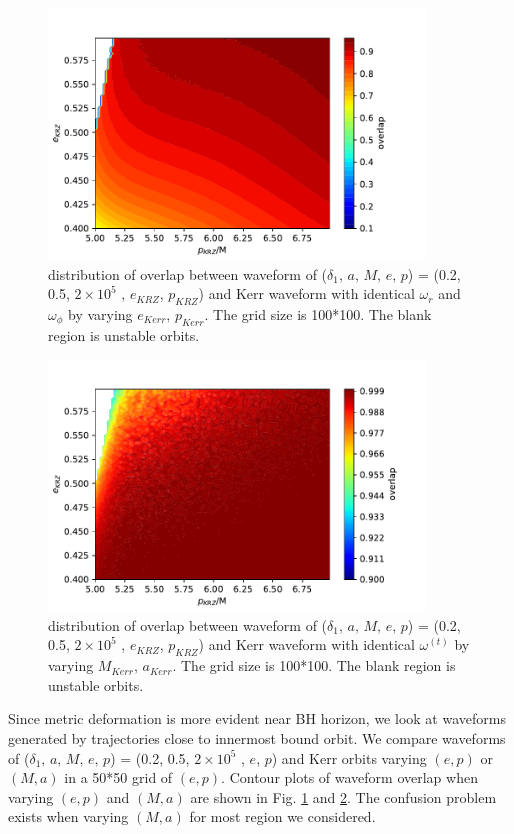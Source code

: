 \documentclass{article}
\begin{document}
	\begin{figure}[!h]
	\centering
	\includegraphics[width=10cm]{ep_best_dist.pdf}
	
	\caption{distribution of overlap between waveform of ($\delta_1,\, a,\, M,\, e,\, p$) = (0.2, 0.5, $2 \times 10^5 $ , $e_{KRZ}$, $p_{KRZ}$) and Kerr waveform with identical $\omega_r$ and $\omega_\phi$ by varying $e_{Kerr},\, p_{Kerr}$. The grid size is 100*100. The blank region is unstable orbits.}
	\label{epdist}
\end{figure}	

	\begin{figure}[!ht]
	\centering
	\includegraphics[width=10cm]{FF_am.pdf}
	
	\caption{distribution of overlap between waveform of ($\delta_1,\, a,\, M,\, e,\, p$) = (0.2, 0.5, $2 \times 10^5 $ , $e_{KRZ}$, $p_{KRZ}$) and Kerr waveform with identical $\omega^{(t)}$ by varying $M_{Kerr},\, a_{Kerr}$. The grid size is 100*100. The blank region is unstable orbits.}
	\label{amdist}
\end{figure}	

Since metric deformation is more evident near BH horizon, we look at waveforms generated by trajectories close to innermost bound orbit. We compare waveforms of ($\delta_1,\, a,\, M,\, e,\, p$) = (0.2, 0.5, $2 \times 10^5 $ , $e$, $p$) and Kerr orbits varying $(e,p)$ or $(M,a)$ in a 50*50 grid of $(e,p)$. Contour plots of waveform overlap when varying $(e,p)$ and $(M,a)$ are shown in Fig. \ref{epdist} and \ref{amdist}. The confusion problem exists when varying $(M,a)$ for most region we considered. 
\end{document}
